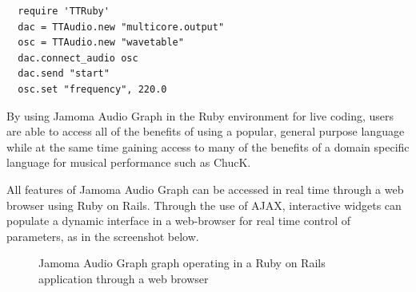 \documentclass[twoside,a4paper]{article}
\begin{document}
\begin{lstlisting}
  require 'TTRuby'
  dac = TTAudio.new "multicore.output"
  osc = TTAudio.new "wavetable"
  dac.connect_audio osc
  dac.send "start"
  osc.set "frequency", 220.0
\end{lstlisting}

\noindent By using Jamoma Audio Graph in the Ruby environment for live coding, users are able to access all of the benefits of using a popular, general purpose language while at the same time gaining access to many of the benefits of a domain specific language for musical performance such as ChucK.


All features of Jamoma Audio Graph can be accessed in real time through a web browser using Ruby on Rails.  Through the use of AJAX, interactive widgets can populate a dynamic interface in a web-browser for real time control of parameters, as in the screenshot below.

\begin{figure}[htbp]
\centerline{}
\caption{Jamoma Audio Graph graph operating in a Ruby on Rails application through a web browser}
\label{fig:rails}
\end{figure}
\end{document}

